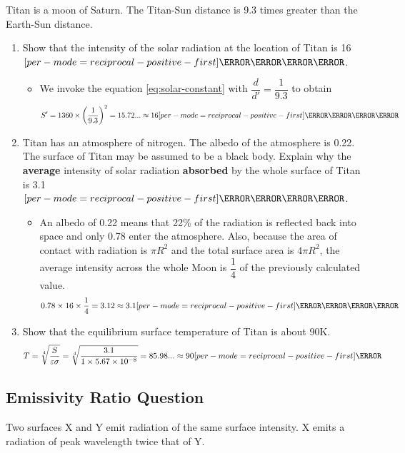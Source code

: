 \documentclass[a4paper,12pt]{article}
\let\oldsi\si
\renewcommand{\si}[1]{\oldsi[per-mode=reciprocal-positive-first]{#1}}
\newcommand{\paren}[1]{\left(#1\right)}
\begin{document}
Titan is a moon of Saturn. The Titan-Sun distance is 9.3 times greater than the Earth-Sun distance.
\begin{enumerate}[label=(\alph*)]
  \item Show that the intensity of the solar radiation at the location of Titan is 16 $\si{\W\per\m\squared}$.
        \begin{itemize}
          \item We invoke the equation \cref{eq:solar-constant} with $\dfrac{d}{d'} = \dfrac{1}{9.3}$ to obtain
                $$S' = 1360 \times \paren{\frac{1}{9.3}}^2 = 15.72... \approx 16 \si{\W\per\m\squared}$$
        \end{itemize}
  \item Titan has an atmosphere of nitrogen. The albedo of the atmosphere is 0.22. The surface of Titan may be assumed to be a black body. Explain why the \textbf{average} intensity of solar radiation \textbf{absorbed} by the whole surface of Titan is 3.1$\si{\W\per\m\squared}$.
        \begin{itemize}
          \item An albedo of 0.22 means that 22\% of the radiation is reflected back into space and only 0.78 enter the atmosphere. Also, because the area of contact with radiation is $\pi R^2$ and the total surface area is $4\pi R^2$, the average intensity across the whole Moon is $\dfrac{1}{4}$ of the previously calculated value.
                \begin{align*}
                  0.78 \times 16 \times \frac{1}{4} = 3.12 \approx 3.1 \si{\W\per\m\squared}
                \end{align*}
        \end{itemize}
  \item Show that the equilibrium surface temperature of Titan is about 90K.
        \begin{align*}
          T & = \sqrt[4]{\frac{S}{\varepsilon \sigma}} = \sqrt[4]{\frac{3.1}{1 \times 5.67 \times 10^{-8}}} = 85.98... \approx 90 \si{\K} \\
        \end{align*}
\end{enumerate}

\pagebreak

\subsection{Emissivity Ratio Question}

Two surfaces X and Y emit radiation of the same surface intensity. X emits a radiation of peak wavelength twice that of Y.
\end{document}
